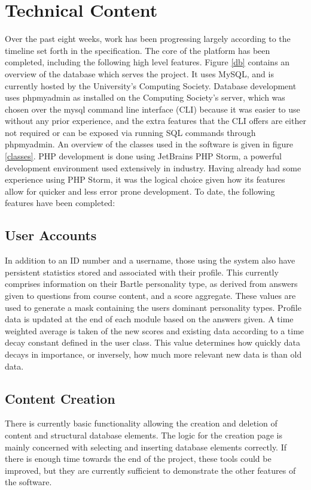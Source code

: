 \documentclass[10pt,a4paper]{report}
\begin{document}
\section*{Technical Content}
Over the past eight weeks, work has been progressing largely according to the timeline set forth in the specification. The core of the platform has been completed, including the following high level features. Figure \ref{db} contains an overview of the database which serves the project. It uses MySQL, and is currently hosted by the University's Computing Society. Database development uses phpmyadmin as installed on the Computing Society's server, which was chosen over the mysql command line interface (CLI) because it was easier to use without any prior experience, and the extra features that the CLI offers are either not required or can be exposed via running SQL commands through phpmyadmin. An overview of the classes used in the software is given in figure \ref{classes}.  PHP development is done using JetBrains PHP Storm, a powerful development environment used extensively in industry. Having already had some experience using PHP Storm, it was the logical choice given how its features allow for quicker and less error prone development. To date, the following features have been completed:

\subsection*{User Accounts}
In addition to an ID number and a username, those using the system also have persistent statistics stored and associated with their profile. This currently comprises information on their Bartle personality type, as derived from answers given to questions from course content, and a score aggregate. These values are used to generate a mask containing the users dominant personality types. Profile data is updated at the end of each module based on the answers given. A time weighted average is taken of the new scores and existing data according to a time decay constant defined in the user class. This value determines how quickly data decays in importance, or inversely, how much more relevant new data is than old data.

\subsection*{Content Creation}
There is currently basic functionality allowing the creation and deletion of content and structural database elements. The logic for the creation page is mainly concerned with selecting and inserting database elements correctly. If there is enough time towards the end of the project, these tools could be improved, but they are currently sufficient to demonstrate the other features of the software.
\end{document}
